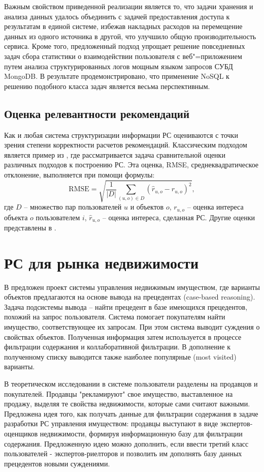 \documentclass[a4paper,14pt,openany,final]{extreport} %
\begin{document}
    Важным свойством приведенной реализации является то, что задачи хранения и анализа данных удалось объединить с задачей предоставления доступа к результатам в единой системе, избежав накладных расходов на перемещение данных из одного источника в другой, что улучшило общую производительность сервиса. Кроме того, предложенный подход упрощает решение повседневных задач сбора статистики о взаимодействии пользователя с веб"=приложением путем анализа структурированных логов мощным языком запросов СУБД MongoDB.  В результате продемонстрировано, что применение NoSQL к решению подобного класса задач является весьма перспективным.

\subsection{Оценка релевантности рекомендаций}
\label{sec:rs-eval}

Как и любая система структуризации информации РС оцениваются с точки зрения степени корректности расчетов рекомендаций. Классическим подходом является пример из \cite{b13}, где рассматривается задача сравнительной оценки различных подходов к построению РС.  Эта оценка, RMSE, среднеквадратическое отклонение, выполняется при помощи формулы:
    \[
      \mbox{RMSE}=\sqrt{\frac{1}{|D|}\sum_{(u,o)\in D}(\hat{r}_{u,o}-r_{u,o})^2},
    \]
где $D$ -- множество пар пользователей $u$ и объектов $o$, $r_{u,o}$ -- оценка интереса объекта $o$ пользователем $i$, \(\hat{r}_{u,o}\) -- оценка интереса, сделанная РС. Другие оценки представлены в \cite{b10}. %




\section{РС для рынка недвижимости}
\label{sec:ex-retail}


В \cite{Alrawhani} предложен проект системы управления недвижимым имуществом, где варианты объектов предлагаются на основе вывода на прецедентах (case-based reasoning). Задача подсистемы вывода – найти  прецедент в базе имеющихся прецедентов, похожий на запрос пользователя. Система помогает покупателям найти имущество, соответствующее их запросам. При этом система выводит суждения о свойствах объектов. Полученная информация затем используется в процессе фильтрации содержания и коллаборативной фильтрации. В дополнение к полученному списку выводится также наиболее популярные (most visited) варианты.

В теоретическом исследовании \cite{b15} в системе пользователи разделены на продавцов и покупателей. Продавцы "рекламируют" свое имущество, выставленное на продажу, выделяя те свойства недвижимости, которые сами считают важными. Предложена идея того, как получать данные для фильтрации содержания в задаче разработки РС управления имуществом: продавцы выступают в виде экспертов-оценщиков недвижимости, формируя информационную базу для фильтрации содержания. Предложенную идею можно дополнить, если ввести третий класс пользователей - экспертов-риелторов и позволить им дополнять базу данных прецедентов новыми суждениями.
\end{document}
